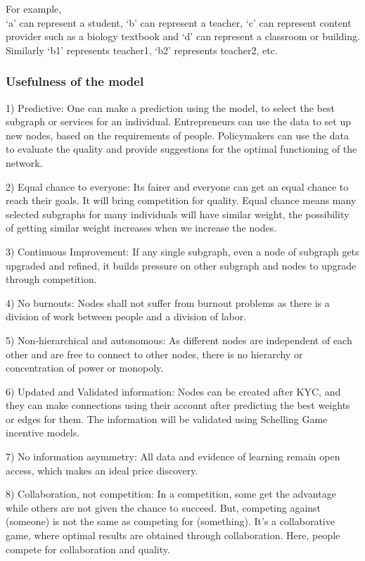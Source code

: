 \documentclass[a4paper,12pt,twoside]{extarticle}
\begin{document}
\begin{adjustwidth}{11em}{}
    For example,\\
    ‘a’ can represent a student, ‘b’ can represent a teacher, ‘c’ can represent content provider such as a biology textbook and ‘d’ can represent a classroom or building.
    Similarly ‘b1’ represents teacher1, ‘b2’ represents teacher2, etc.
    
\subsubsection*{Usefulness of the model}
1) Predictive: One can make a prediction using the model, to select the best subgraph or services for an individual. Entrepreneurs can use the data to set up new nodes, based on the requirements of people. Policymakers can use the data to evaluate the quality and provide suggestions for the optimal functioning of the network.

2) Equal chance to everyone: Its fairer and everyone can get an equal chance to reach their goals. It will bring competition for quality. Equal chance means many selected subgraphs for many individuals will have similar weight, the possibility of getting similar weight increases when we increase the nodes.

3) Continuous Improvement: If any single subgraph, even a node of subgraph gets upgraded and refined, it builds pressure on other subgraph and nodes to upgrade through competition.

4) No burnouts: Nodes shall not suffer from burnout problems as there is a division of work between people and a division of labor.

5) Non-hierarchical and autonomous: As different nodes are independent of each other and are free to connect to other nodes, there is no hierarchy or concentration of power or monopoly.

6) Updated and Validated information: Nodes can be created after KYC, and they can make connections using their account after predicting the best weights or edges for them. The information will be validated using Schelling Game incentive models.

7) No information asymmetry: All data and evidence of learning remain open access, which makes an ideal price discovery. 

8) Collaboration, not competition: In a competition, some get the advantage while others are not given the chance to succeed.  But, competing against (someone) is not the same as competing for (something). It's a collaborative game, where optimal results are obtained through collaboration. Here, people compete for collaboration and quality. 


\end{adjustwidth}
\end{document}
